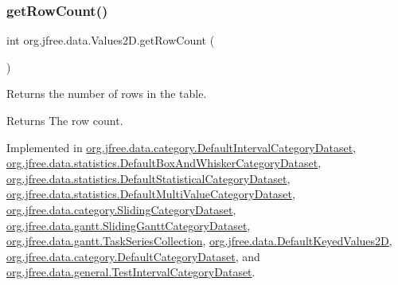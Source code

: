 \mbox{\label{interfaceorg_1_1jfree_1_1data_1_1_values2_d_a9ce939b45128515a9841a7d018a6ad0e}} 
\subsubsection{\texorpdfstring{get\+Row\+Count()}{getRowCount()}}
{\footnotesize\ttfamily int org.\+jfree.\+data.\+Values2\+D.\+get\+Row\+Count (\begin{DoxyParamCaption}{ }\end{DoxyParamCaption})}

Returns the number of rows in the table.

\begin{DoxyReturn}{Returns}
The row count. 
\end{DoxyReturn}


Implemented in \mbox{\hyperlink{classorg_1_1jfree_1_1data_1_1category_1_1_default_interval_category_dataset_af827538c915c040aac83c23bc980b0f5}{org.\+jfree.\+data.\+category.\+Default\+Interval\+Category\+Dataset}}, \mbox{\hyperlink{classorg_1_1jfree_1_1data_1_1statistics_1_1_default_box_and_whisker_category_dataset_ad7b6f1dc5d0b2641c579d88d0604bb7b}{org.\+jfree.\+data.\+statistics.\+Default\+Box\+And\+Whisker\+Category\+Dataset}}, \mbox{\hyperlink{classorg_1_1jfree_1_1data_1_1statistics_1_1_default_statistical_category_dataset_ae1ca17a2e7625045f1fd159054566ca8}{org.\+jfree.\+data.\+statistics.\+Default\+Statistical\+Category\+Dataset}}, \mbox{\hyperlink{classorg_1_1jfree_1_1data_1_1statistics_1_1_default_multi_value_category_dataset_a50738261879dea73f8198740a043f342}{org.\+jfree.\+data.\+statistics.\+Default\+Multi\+Value\+Category\+Dataset}}, \mbox{\hyperlink{classorg_1_1jfree_1_1data_1_1category_1_1_sliding_category_dataset_a481c79a7d0e11052061f04089b36c18c}{org.\+jfree.\+data.\+category.\+Sliding\+Category\+Dataset}}, \mbox{\hyperlink{classorg_1_1jfree_1_1data_1_1gantt_1_1_sliding_gantt_category_dataset_a161f3ba2f0f4e57a13a4f49efc945314}{org.\+jfree.\+data.\+gantt.\+Sliding\+Gantt\+Category\+Dataset}}, \mbox{\hyperlink{classorg_1_1jfree_1_1data_1_1gantt_1_1_task_series_collection_a241faa2771f4db77832e388e6a63026b}{org.\+jfree.\+data.\+gantt.\+Task\+Series\+Collection}}, \mbox{\hyperlink{classorg_1_1jfree_1_1data_1_1_default_keyed_values2_d_aaa4f83398caf1c5a2e59e719d72de13f}{org.\+jfree.\+data.\+Default\+Keyed\+Values2D}}, \mbox{\hyperlink{classorg_1_1jfree_1_1data_1_1category_1_1_default_category_dataset_ae3c00007b8dd22c911f2cb6463508785}{org.\+jfree.\+data.\+category.\+Default\+Category\+Dataset}}, and \mbox{\hyperlink{classorg_1_1jfree_1_1data_1_1general_1_1_test_interval_category_dataset_a7e80e09ec80cc2e473d4257ff3d59af5}{org.\+jfree.\+data.\+general.\+Test\+Interval\+Category\+Dataset}}.

